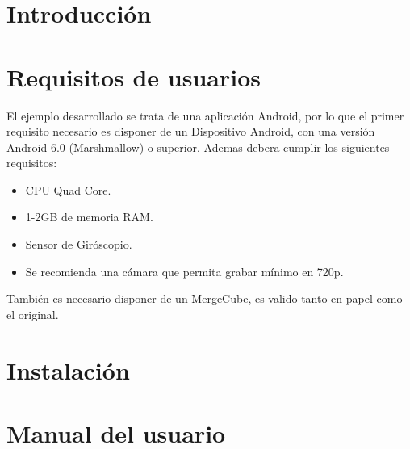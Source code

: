 
\section{Introducción}

\section{Requisitos de usuarios}
 El ejemplo desarrollado se trata de una aplicación Android, por lo que el primer requisito necesario es disponer de un Dispositivo Android, con una versión Android 6.0 (Marshmallow) o superior. 
 Ademas debera cumplir los siguientes requisitos:
 \begin{itemize}
 	\item CPU Quad Core.
 	\item 1-2GB de memoria RAM.
 	\item Sensor de Giróscopio.
 	\item Se recomienda una cámara que permita grabar mínimo en 720p.  
 \end{itemize}
También es necesario disponer de un MergeCube, es valido tanto en papel como el original. 
\section{Instalación}

\section{Manual del usuario}


